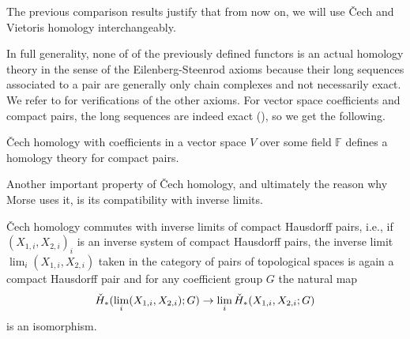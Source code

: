 The previous comparison results justify that from now on, we will use \v{C}ech and Vietoris homology interchangeably.

In full generality, none of of the previously defined functors is an actual homology theory in the sense of the Eilenberg-Steenrod axioms because their long sequences associated to a pair are generally only chain complexes and not necessarily exact. We refer to \cite[Section IX--X]{MR0050886} for verifications of the other axioms. For vector space coefficients and compact pairs, the long sequences are indeed exact (\cite{Kelly.1961}), so we get the following.

\begin{thm}
\v{C}ech homology with coefficients in a vector space $V$ over some field $\mathbb{F}$ defines a homology theory for compact pairs.
\end{thm}

Another important property of \v{C}ech homology, and ultimately the reason why Morse uses it, is its compatibility with inverse limits.

\begin{thm}
\v{C}ech homology commutes with inverse limits of compact Hausdorff pairs, i.e., if $(X_{1,i},X_{2,i})_{i}$ is an inverse system of compact Hausdorff pairs, the inverse limit $\lim_{i}(X_{1,i},X_{2,i})$ taken in the category of pairs of topological spaces is again a compact Hausdorff pair and for any coefficient group $G$ the natural map
\[
\check{H}_{*}(\lim_{i}(X_{1,i},X_{2,i});G)\to\lim_{i}\check{H}_{*}(X_{1,i},X_{2,i};G)
\]
is an isomorphism.
\end{thm}


